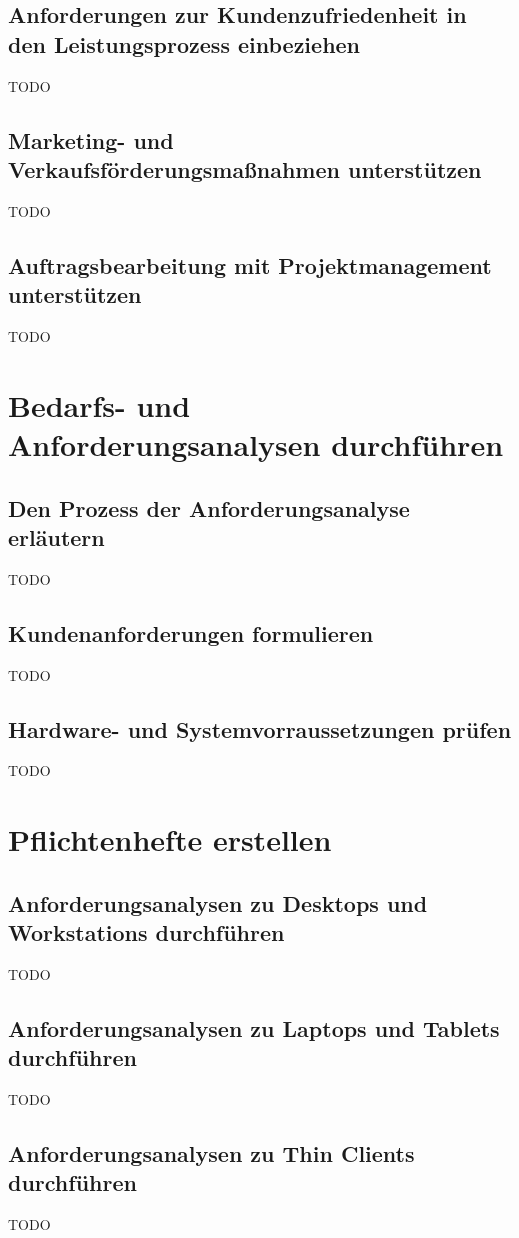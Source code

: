\documentclass[11pt]{article}
\begin{document}
\subsection{Anforderungen zur Kundenzufriedenheit in den Leistungsprozess einbeziehen}
    TODO
\subsection{Marketing- und Verkaufsförderungsmaßnahmen unterstützen}
    TODO
\subsection{Auftragsbearbeitung mit Projektmanagement unterstützen}
    TODO

\newpage
\section{Bedarfs- und Anforderungsanalysen durchführen}
\subsection{Den Prozess der Anforderungsanalyse erläutern}
    TODO
\subsection{Kundenanforderungen formulieren}
    TODO
\subsection{Hardware- und Systemvorraussetzungen prüfen}
    TODO

\newpage
\section{Pflichtenhefte erstellen}
\subsection{Anforderungsanalysen zu Desktops und Workstations durchführen}
    TODO
\subsection{Anforderungsanalysen zu Laptops und Tablets durchführen}
    TODO
\subsection{Anforderungsanalysen zu Thin Clients durchführen}
    TODO
\end{document}
